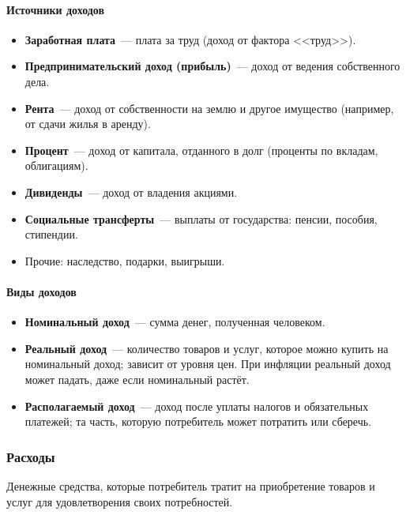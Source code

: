 \documentclass[12pt]{article}
\begin{document}
	\paragraph{Источники доходов}
	\begin{itemize}
		\item \textbf{Заработная плата}~--- плата за труд (доход от фактора <<труд>>).
		\item \textbf{Предпринимательский доход (прибыль)}~--- доход от ведения собственного дела.
		\item \textbf{Рента}~--- доход от собственности на землю и другое имущество (например, от сдачи жилья в аренду).
		\item \textbf{Процент}~--- доход от капитала, отданного в долг (проценты по вкладам, облигациям).
		\item \textbf{Дивиденды}~--- доход от владения акциями.
		\item \textbf{Социальные трансферты}~--- выплаты от государства: пенсии, пособия, стипендии.
		\item Прочие: наследство, подарки, выигрыши.
	\end{itemize}
	
	\paragraph{Виды доходов}
	\begin{itemize}
		\item \textbf{Номинальный доход}~--- сумма денег, полученная человеком.
		\item \textbf{Реальный доход}~--- количество товаров и услуг, которое можно купить на номинальный доход; зависит от уровня цен. При инфляции реальный доход может падать, даже если номинальный растёт.
		\item \textbf{Располагаемый доход}~--- доход после уплаты налогов и обязательных платежей; та часть, которую потребитель может потратить или сберечь.
	\end{itemize}
	
	\subsubsection{Расходы}
	
	\begin{definition}
		Денежные средства, которые потребитель тратит на приобретение товаров и услуг для удовлетворения своих потребностей.
	\end{definition}
	
\end{document}
